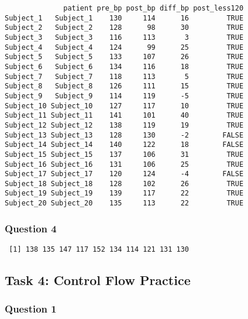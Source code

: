 \documentclass[
  letterpaper,
  DIV=11,
  numbers=noendperiod]{scrartcl}
\newenvironment{Shaded}{\begin{snugshade}}{\end{snugshade}}
\newcommand{\NormalTok}[1]{\textcolor[rgb]{0.00,0.23,0.31}{#1}}
\newcommand{\SpecialCharTok}[1]{\textcolor[rgb]{0.37,0.37,0.37}{#1}}
\begin{document}
\begin{verbatim}
              patient pre_bp post_bp diff_bp post_less120
Subject_1   Subject_1    130     114      16         TRUE
Subject_2   Subject_2    128      98      30         TRUE
Subject_3   Subject_3    116     113       3         TRUE
Subject_4   Subject_4    124      99      25         TRUE
Subject_5   Subject_5    133     107      26         TRUE
Subject_6   Subject_6    134     116      18         TRUE
Subject_7   Subject_7    118     113       5         TRUE
Subject_8   Subject_8    126     111      15         TRUE
Subject_9   Subject_9    114     119      -5         TRUE
Subject_10 Subject_10    127     117      10         TRUE
Subject_11 Subject_11    141     101      40         TRUE
Subject_12 Subject_12    138     119      19         TRUE
Subject_13 Subject_13    128     130      -2        FALSE
Subject_14 Subject_14    140     122      18        FALSE
Subject_15 Subject_15    137     106      31         TRUE
Subject_16 Subject_16    131     106      25         TRUE
Subject_17 Subject_17    120     124      -4        FALSE
Subject_18 Subject_18    128     102      26         TRUE
Subject_19 Subject_19    139     117      22         TRUE
Subject_20 Subject_20    135     113      22         TRUE
\end{verbatim}

\subsubsection{Question 4}\label{question-4-2}

\begin{Shaded}
\end{Shaded}

\begin{verbatim}
 [1] 138 135 147 117 152 134 114 121 131 130
\end{verbatim}

\subsection{Task 4: Control Flow
Practice}\label{task-4-control-flow-practice}

\subsubsection{Question 1}\label{question-1-3}
\end{document}
